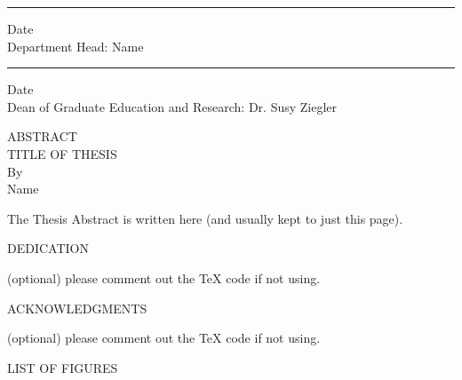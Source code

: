 \documentclass[12pt]{article}
\begin{document}
\noindent\rule{4.3in}{0.75pt} \hspace{0.3in} Date\\[3mm]
Department Head: Name\\[3mm]

\noindent\rule{4.3in}{0.75pt} \hspace{0.3in} Date\\[3mm]
Dean of Graduate Education and Research: Dr. Susy Ziegler\\[3mm]


\newpage
\pagestyle{plain}
\begin{center}
{ABSTRACT}\\[0.25in]
{TITLE OF THESIS}\\[0.25in]
By\\[0.25in]
Name\\[0.5in]
\end{center}

The Thesis Abstract is written here (and usually kept to just this page).


\newpage
\vspace*{3in}
{DEDICATION}\\[0.5in]
\begin{center}
(optional) please comment out the TeX code if not using.
\end{center}


\newpage
\begin{center}
{ACKNOWLEDGMENTS}\\[0.5in]
\end{center}
(optional) please comment out the TeX code if not using.


\newpage
\tableofcontents


\newpage
{} %
\begin{center}
{LIST OF FIGURES}\\[0.5in]
\end{center}
\end{document}
